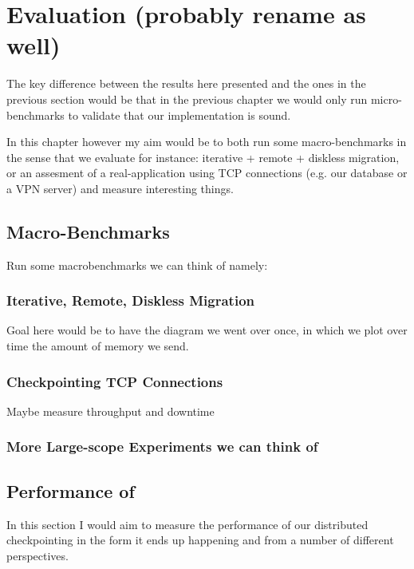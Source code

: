 \chapter{Evaluation (probably rename as well)} \label{chap:evaluation}

The key difference between the results here presented and the ones in the previous section would be that in the previous chapter we would only run micro-benchmarks to validate that our implementation is sound.

In this chapter however my aim would be to both run some macro-benchmarks in the sense that we evaluate for instance: iterative + remote + diskless migration, or an assesment of a real-application using TCP connections (e.g. our database or a VPN server) and measure interesting things.

\section{Macro-Benchmarks}

Run some macrobenchmarks we can think of namely:

\subsection{Iterative, Remote, Diskless Migration}

Goal here would be to have the diagram we went over once, in which we plot over time the amount of memory we send.

\subsection{Checkpointing TCP Connections}

Maybe measure throughput and downtime

\subsection{More Large-scope Experiments we can think of}

\section{Performance of \projName}

In this section I would aim to measure the performance of our distributed checkpointing in the form it ends up happening and from a number of different perspectives.

